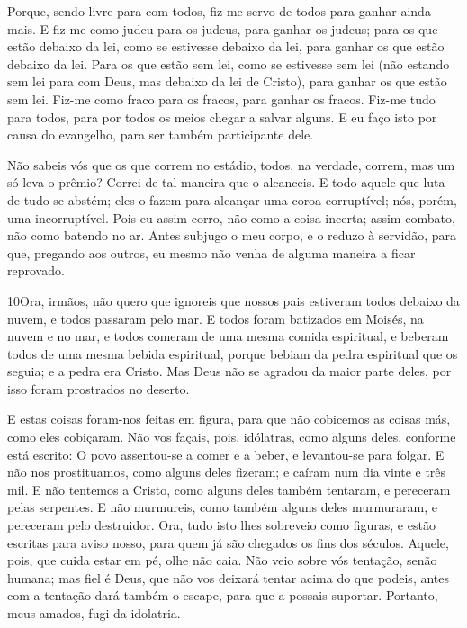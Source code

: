 Porque, sendo livre para com todos, fiz-me servo de todos para
ganhar ainda mais. E fiz-me como judeu para os judeus, para
ganhar os judeus; para os que estão debaixo da lei, como se
estivesse debaixo da lei, para ganhar os que estão debaixo da lei.
Para os que estão sem lei, como se estivesse sem lei (não
estando sem lei para com Deus, mas debaixo da lei de Cristo), para
ganhar os que estão sem lei. Fiz-me como fraco para os
fracos, para ganhar os fracos. Fiz-me tudo para todos, para por
todos os meios chegar a salvar alguns. E eu faço isto por
causa do evangelho, para ser também participante dele.

Não sabeis vós que os que correm no estádio, todos, na verdade,
correm, mas um só leva o prêmio? Correi de tal maneira que o
alcanceis. E todo aquele que luta de tudo se abstém; eles o
fazem para alcançar uma coroa corruptível; nós, porém, uma
incorruptível. Pois eu assim corro, não como a coisa incerta;
assim combato, não como batendo no ar. Antes subjugo o meu
corpo, e o reduzo à servidão, para que, pregando aos outros, eu
mesmo não venha de alguma maneira a ficar reprovado.

\medskip

\lettrine{10} Ora, irmãos, não quero que ignoreis que nossos
pais estiveram todos debaixo da nuvem, e todos passaram pelo mar.
E todos foram batizados em Moisés, na nuvem e no mar, e
todos comeram de uma mesma comida espiritual, e beberam todos de
uma mesma bebida espiritual, porque bebiam da pedra espiritual que
os seguia; e a pedra era Cristo. Mas Deus não se agradou da
maior parte deles, por isso foram prostrados no deserto.

E estas coisas foram-nos feitas em figura, para que não cobicemos
as coisas más, como eles cobiçaram. Não vos façais, pois,
idólatras, como alguns deles, conforme está escrito: O povo
assentou-se a comer e a beber, e levantou-se para folgar. E não
nos prostituamos, como alguns deles fizeram; e caíram num dia vinte
e três mil. E não tentemos a Cristo, como alguns deles também
tentaram, e pereceram pelas serpentes. E não murmureis, como
também alguns deles murmuraram, e pereceram pelo destruidor.
Ora, tudo isto lhes sobreveio como figuras, e estão escritas
para aviso nosso, para quem já são chegados os fins dos séculos.
Aquele, pois, que cuida estar em pé, olhe não caia.
Não veio sobre vós tentação, senão humana; mas fiel é Deus,
que não vos deixará tentar acima do que podeis, antes com a tentação
dará também o escape, para que a possais suportar. Portanto,
meus amados, fugi da idolatria.

